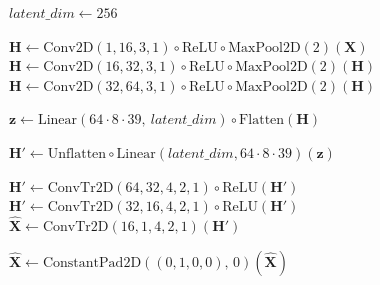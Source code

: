 \begin{algorithm}[H]
\caption{Convolutional Autoencoder with Constant Padding}

\DontPrintSemicolon

$\textit{latent\_dim} \leftarrow 256$\;

\BlankLine
$\mathbf H \leftarrow \mathrm{Conv2D}(1,16,3,1)\!\circ\!\mathrm{ReLU}\!\circ\!\mathrm{MaxPool2D}(2)(\mathbf X)$\;
$\mathbf H \leftarrow \mathrm{Conv2D}(16,32,3,1)\!\circ\!\mathrm{ReLU}\!\circ\!\mathrm{MaxPool2D}(2)(\mathbf H)$\;
$\mathbf H \leftarrow \mathrm{Conv2D}(32,64,3,1)\!\circ\!\mathrm{ReLU}\!\circ\!\mathrm{MaxPool2D}(2)(\mathbf H)$

\BlankLine
$\mathbf z \leftarrow \mathrm{Linear}(64\!\cdot\!8\!\cdot\!39,\ \textit{latent\_dim})\!\circ\!\mathrm{Flatten}(\mathbf H)$\;

\BlankLine
$\mathbf H' \leftarrow \mathrm{Unflatten}\!\circ\!\mathrm{Linear}(\textit{latent\_dim},64\!\cdot\!8\!\cdot\!39)(\mathbf z)$\;

\BlankLine
$\mathbf H' \leftarrow \mathrm{ConvTr2D}(64,32,4,2,1)\!\circ\!\mathrm{ReLU}(\mathbf H')$\;
$\mathbf H' \leftarrow \mathrm{ConvTr2D}(32,16,4,2,1)\!\circ\!\mathrm{ReLU}(\mathbf H')$\;
$\hat{\mathbf X} \leftarrow \mathrm{ConvTr2D}(16,1,4,2,1)(\mathbf H')$\;

\BlankLine
$\hat{\mathbf X} \leftarrow \mathrm{ConstantPad2D}((0,1,0,0),\,0)(\hat{\mathbf X})$\;

\end{algorithm}


